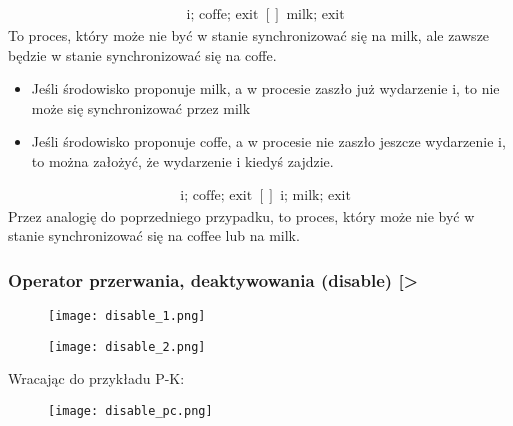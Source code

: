 \documentclass[a4paper,15pt]{article}
\newcommand{\example}[2]{
    \begin{tcolorbox}[colback=blue!5!white,colframe=blue,title={Przykład #1}]
        #2
    \end{tcolorbox}
}
\begin{document}
\example{}{
\begin{align*}
& \text{i; coffe; exit } [] \text{ milk; exit}
\end{align*}
To proces, który może nie być w stanie synchronizować się na milk, ale zawsze będzie w stanie synchronizować się na coffe.
\begin{itemize}
\item Jeśli środowisko proponuje milk, a w procesie zaszło już wydarzenie i, to nie może się synchronizować przez milk
\item Jeśli środowisko proponuje coffe, a w procesie nie zaszło jeszcze wydarzenie i, to można założyć, że wydarzenie i kiedyś zajdzie.
\end{itemize}
}

\example{}{
\begin{align*}
& \text{i; coffe; exit } [] \text{ i; milk; exit}
\end{align*}
Przez analogię do poprzedniego przypadku, to proces, który może nie być w stanie synchronizować się na coffee lub na milk.
}





\newpage
\subsubsection{Operator przerwania, deaktywowania (disable) [>}
\begin{figure}[H]
\centerline{\texttt{[image: disable\_1.png]}}
\label{fig:disable1}
\end{figure}
\begin{figure}[H]
\centerline{\texttt{[image: disable\_2.png]}}
\label{fig:disable2}
\end{figure}

\newpage
Wracając do przykładu P-K:
\begin{figure}[H]
\centerline{\texttt{[image: disable\_pc.png]}}
\label{fig:disable_pc}
\end{figure}




\newpage
\end{document}
